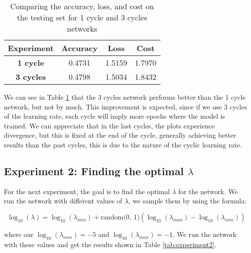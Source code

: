 \documentclass{article}
\begin{document}
\begin{table}[h]
    \centering
    \begin{tabular}{|c|c|c|c|}
    \hline
    \textbf{Experiment} & \textbf{Accuracy} & \textbf{Loss} & \textbf{Cost} \\
    \hline
    \textbf{1 cycle} & 0.4731 & 1.5159 & 1.7970 \\
    \textbf{3 cycles} & 0.4798 & 1.5034 & 1.8432 \\
    \hline
\end{tabular}
\caption{Comparing the accuracy, loss, and cost on the testing set for 1 cycle and 3 cycles networks}
\label{tab:experiment1}
\end{table}

We can see in Table \ref{tab:experiment1} that the 3 cycles network performs better than the 1 cycle network, but not by much. This improvement is expected, since if we use 3 cycles of the learning rate, each cycle will imply more epochs where the model is trained. We can appreciate that in the last cycles, the plots experience divergence, but this is fixed at the end of the cycle, generally achieving better results than the past cycles, this is due to the nature of the cyclic learning rate.


\subsection{Experiment 2: Finding the optimal $\lambda$}

For the next experiment, the goal is to find the optimal $\lambda$ for the network. We run the network with different values of $\lambda$, we sample them by using the formula:

\begin{equation}
    \log_{10}(\lambda) = \log_{10}(\lambda_{min}) + \text{random(0, 1)} (\log_{10}(\lambda_{max}) - \log_{10}(\lambda_{min}))
\end{equation}

where our $\log_{10}(\lambda_{min}) = -5$ and $\log_{10}(\lambda_{max}) = -1$. We run the network with these values and get the results shown in Table \ref{tab:experiment2}.
\end{document}
